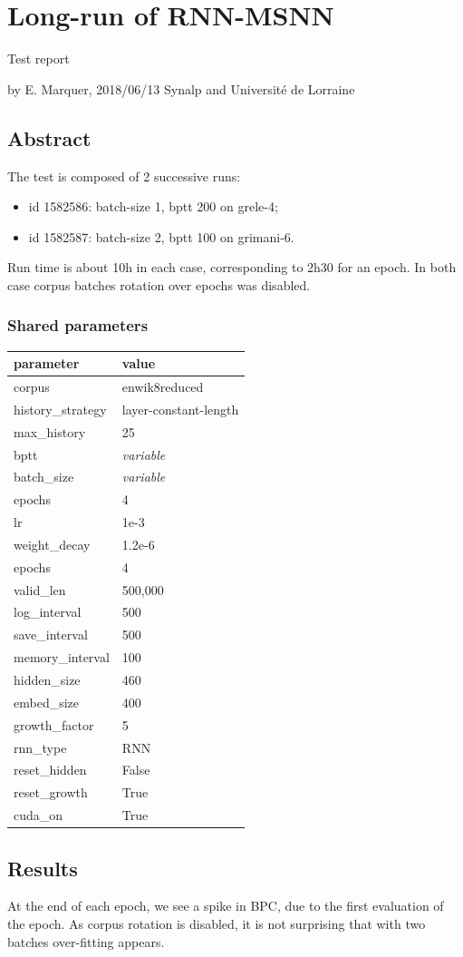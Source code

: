 \section*{Long-run of RNN-MSNN}

Test report

by E. Marquer, 2018/06/13 Synalp and Université de Lorraine

\subsection{Abstract}

The test is composed of 2 successive runs:
\begin{itemize}
\item id 1582586: batch-size 1, bptt 200 on grele-4;
\item id 1582587: batch-size 2, bptt 100 on grimani-6.
\end{itemize}

Run time is about 10h in each case, corresponding to 2h30 for an epoch.
In both case corpus batches rotation over epochs was disabled.

\subsubsection{Shared parameters}

\begin{longtable}[]{@{}ll@{}}
\hline
parameter & value\tabularnewline
\hline
\endhead
corpus & enwik8reduced\tabularnewline
history\_strategy & layer-constant-length\tabularnewline
max\_history & 25\tabularnewline
bptt & \emph{variable}\tabularnewline
batch\_size & \emph{variable}\tabularnewline
epochs & 4\tabularnewline
lr & 1e-3\tabularnewline
weight\_decay & 1.2e-6\tabularnewline
epochs & 4\tabularnewline
valid\_len & 500,000\tabularnewline
log\_interval & 500\tabularnewline
save\_interval & 500\tabularnewline
memory\_interval & 100\tabularnewline
hidden\_size & 460\tabularnewline
embed\_size & 400\tabularnewline
growth\_factor & 5\tabularnewline
rnn\_type & RNN\tabularnewline
reset\_hidden & False\tabularnewline
reset\_growth & True\tabularnewline
cuda\_on & True\tabularnewline
\hline
\end{longtable}

\subsection{Results}

At the end of each epoch, we see a spike in BPC, due to the first
evaluation of the epoch. As corpus rotation is disabled, it is not
surprising that with two batches over-fitting appears.

